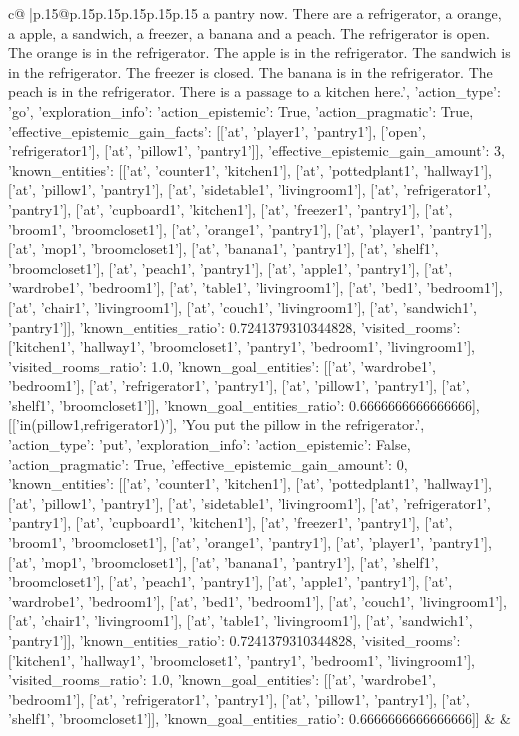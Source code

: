 \documentclass{article}
\begin{document}
{\begin{supertabular}{c@{$\;$}|p{.15\linewidth}@{}p{.15\linewidth}p{.15\linewidth}p{.15\linewidth}p{.15\linewidth}p{.15\linewidth}}
{{{a pantry now. There are a refrigerator, a orange, a apple, a sandwich, a freezer, a banana and a peach. The refrigerator is open. The orange is in the refrigerator. The apple is in the refrigerator. The sandwich is in the refrigerator. The freezer is closed. The banana is in the refrigerator. The peach is in the refrigerator. There is a passage to a kitchen here.', {'action_type': 'go', 'exploration_info': {'action_epistemic': True, 'action_pragmatic': True, 'effective_epistemic_gain_facts': [['at', 'player1', 'pantry1'], ['open', 'refrigerator1'], ['at', 'pillow1', 'pantry1']], 'effective_epistemic_gain_amount': 3, 'known_entities': [['at', 'counter1', 'kitchen1'], ['at', 'pottedplant1', 'hallway1'], ['at', 'pillow1', 'pantry1'], ['at', 'sidetable1', 'livingroom1'], ['at', 'refrigerator1', 'pantry1'], ['at', 'cupboard1', 'kitchen1'], ['at', 'freezer1', 'pantry1'], ['at', 'broom1', 'broomcloset1'], ['at', 'orange1', 'pantry1'], ['at', 'player1', 'pantry1'], ['at', 'mop1', 'broomcloset1'], ['at', 'banana1', 'pantry1'], ['at', 'shelf1', 'broomcloset1'], ['at', 'peach1', 'pantry1'], ['at', 'apple1', 'pantry1'], ['at', 'wardrobe1', 'bedroom1'], ['at', 'table1', 'livingroom1'], ['at', 'bed1', 'bedroom1'], ['at', 'chair1', 'livingroom1'], ['at', 'couch1', 'livingroom1'], ['at', 'sandwich1', 'pantry1']], 'known_entities_ratio': 0.7241379310344828, 'visited_rooms': ['kitchen1', 'hallway1', 'broomcloset1', 'pantry1', 'bedroom1', 'livingroom1'], 'visited_rooms_ratio': 1.0, 'known_goal_entities': [['at', 'wardrobe1', 'bedroom1'], ['at', 'refrigerator1', 'pantry1'], ['at', 'pillow1', 'pantry1'], ['at', 'shelf1', 'broomcloset1']], 'known_goal_entities_ratio': 0.6666666666666666}}], [['in(pillow1,refrigerator1)'], 'You put the pillow in the refrigerator.', {'action_type': 'put', 'exploration_info': {'action_epistemic': False, 'action_pragmatic': True, 'effective_epistemic_gain_amount': 0, 'known_entities': [['at', 'counter1', 'kitchen1'], ['at', 'pottedplant1', 'hallway1'], ['at', 'pillow1', 'pantry1'], ['at', 'sidetable1', 'livingroom1'], ['at', 'refrigerator1', 'pantry1'], ['at', 'cupboard1', 'kitchen1'], ['at', 'freezer1', 'pantry1'], ['at', 'broom1', 'broomcloset1'], ['at', 'orange1', 'pantry1'], ['at', 'player1', 'pantry1'], ['at', 'mop1', 'broomcloset1'], ['at', 'banana1', 'pantry1'], ['at', 'shelf1', 'broomcloset1'], ['at', 'peach1', 'pantry1'], ['at', 'apple1', 'pantry1'], ['at', 'wardrobe1', 'bedroom1'], ['at', 'bed1', 'bedroom1'], ['at', 'couch1', 'livingroom1'], ['at', 'chair1', 'livingroom1'], ['at', 'table1', 'livingroom1'], ['at', 'sandwich1', 'pantry1']], 'known_entities_ratio': 0.7241379310344828, 'visited_rooms': ['kitchen1', 'hallway1', 'broomcloset1', 'pantry1', 'bedroom1', 'livingroom1'], 'visited_rooms_ratio': 1.0, 'known_goal_entities': [['at', 'wardrobe1', 'bedroom1'], ['at', 'refrigerator1', 'pantry1'], ['at', 'pillow1', 'pantry1'], ['at', 'shelf1', 'broomcloset1']], 'known_goal_entities_ratio': 0.6666666666666666}}]] 
	  } 
	   } 
	   } 
	 & & \\ 
 


\end{supertabular}}
\end{document}
